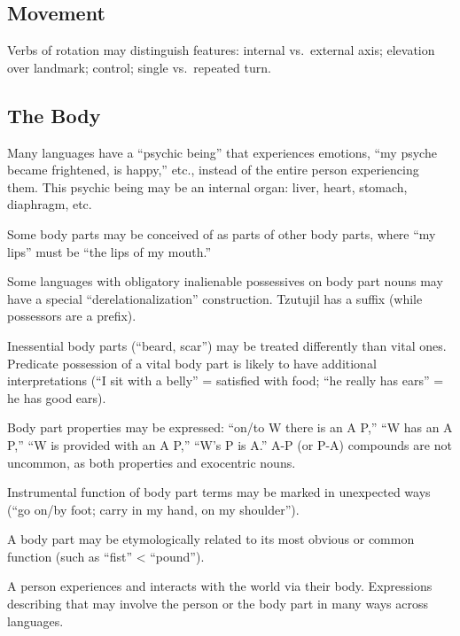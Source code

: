 \documentclass[11pt]{article}
\begin{document}
\subsection{Movement}
Verbs of rotation may distinguish features: internal vs.\ external
axis; elevation over landmark; control; single vs.\ repeated turn.


\subsection{The Body}
Many languages have a ``psychic being'' that experiences emotions,
``my psyche became frightened, is happy,'' etc., instead of the entire
person experiencing them.  This psychic being may be an internal
organ: liver, heart, stomach, diaphragm, etc.

Some body parts may be conceived of as parts of other body parts,
where ``my lips'' must be ``the lips of my mouth.''

Some languages with obligatory inalienable possessives on body part
nouns may have a special ``derelationalization'' construction.
Tzutujil has a suffix (while possessors are a prefix).

Inessential body parts (``beard, scar'') may be treated differently
than vital ones.  Predicate possession of a vital body part is likely
to have additional interpretations (``I sit with a belly'' = satisfied
with food; ``he really has ears'' = he has good ears).

Body part properties may be expressed: ``on/to W there is an A P,''
``W has an A P,'' ``W is provided with an A P,'' ``W's P is A.''  A-P
(or P-A) compounds are not uncommon, as both properties and exocentric
nouns. 

Instrumental function of body part terms may be marked in unexpected
ways (``go on/by foot; carry in my hand, on my shoulder'').

A body part may be etymologically related to its most obvious or
common function (such as ``fist'' < ``pound'').

A person experiences and interacts with the world via their body.
Expressions describing that may involve the person or the body part in
many ways across languages.
\end{document}
